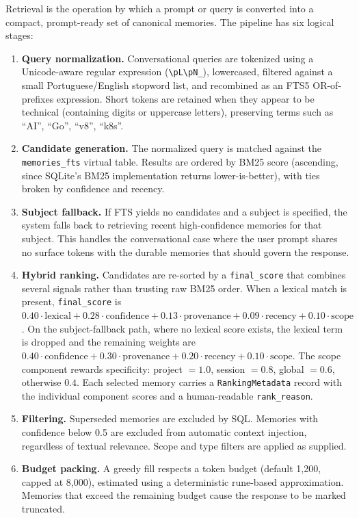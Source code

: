 \documentclass[11pt,a4paper]{article}
\begin{document}
Retrieval is the operation by which a prompt or query is converted into a compact, prompt-ready set of canonical memories. The pipeline has six logical stages:

\begin{enumerate}
 \item \textbf{Query normalization.} Conversational queries are tokenized using a Unicode-aware regular expression (\verb|\pL\pN_|), lowercased, filtered against a small Portuguese/English stopword list, and recombined as an FTS5 OR-of-prefixes expression. Short tokens are retained when they appear to be technical (containing digits or uppercase letters), preserving terms such as ``AI'', ``Go'', ``v8'', ``k8s''.
 \item \textbf{Candidate generation.} The normalized query is matched against the \texttt{memories\_fts} virtual table. Results are ordered by BM25 score (ascending, since SQLite's BM25 implementation returns lower-is-better), with ties broken by confidence and recency.
 \item \textbf{Subject fallback.} If FTS yields no candidates and a subject is specified, the system falls back to retrieving recent high-confidence memories for that subject. This handles the conversational case where the user prompt shares no surface tokens with the durable memories that should govern the response.
 \item \textbf{Hybrid ranking.} Candidates are re-sorted by a \texttt{final\_score} that combines several signals rather than trusting raw BM25 order. When a lexical match is present, \texttt{final\_score} is $0.40 \cdot \mathrm{lexical} + 0.28 \cdot \mathrm{confidence} + 0.13 \cdot \mathrm{provenance} + 0.09 \cdot \mathrm{recency} + 0.10 \cdot \mathrm{scope}$. On the subject-fallback path, where no lexical score exists, the lexical term is dropped and the remaining weights are $0.40 \cdot \mathrm{confidence} + 0.30 \cdot \mathrm{provenance} + 0.20 \cdot \mathrm{recency} + 0.10 \cdot \mathrm{scope}$. The scope component rewards specificity: project $= 1.0$, session $= 0.8$, global $= 0.6$, otherwise $0.4$. Each selected memory carries a \texttt{RankingMetadata} record with the individual component scores and a human-readable \texttt{rank\_reason}.
 \item \textbf{Filtering.} Superseded memories are excluded by SQL. Memories with confidence below 0.5 are excluded from automatic context injection, regardless of textual relevance. Scope and type filters are applied as supplied.
 \item \textbf{Budget packing.} A greedy fill respects a token budget (default 1{,}200, capped at 8{,}000), estimated using a deterministic rune-based approximation. Memories that exceed the remaining budget cause the response to be marked truncated.
\end{enumerate}
\end{document}
